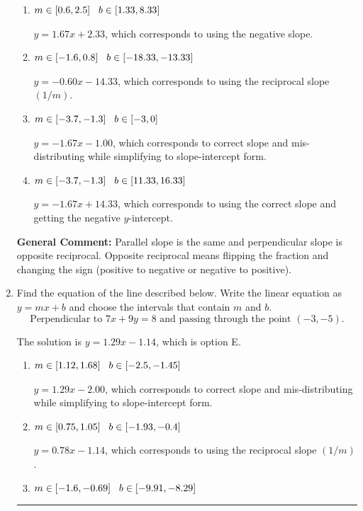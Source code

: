 \documentclass{extbook}[14pt]
\newcommand{\litem}[1]{\item #1

\rule{\textwidth}{0.4pt}}
\begin{document}
\begin{enumerate}
{\begin{enumerate}[label=\Alph*.]
* $y = -1.67x - 14.33$, which is the correct option.
\item \( m \in [0.6, 2.5] \hspace*{3mm} b \in [1.33, 8.33] \)

 $y = 1.67x + 2.33$, which corresponds to using the negative slope.
\item \( m \in [-1.6, 0.8] \hspace*{3mm} b \in [-18.33, -13.33] \)

 $y = -0.60x - 14.33$, which corresponds to using the reciprocal slope $(1/m)$.
\item \( m \in [-3.7, -1.3] \hspace*{3mm} b \in [-3, 0] \)

 $y = -1.67x - 1.00$, which corresponds to correct slope and mis-distributing while simplifying to slope-intercept form.
\item \( m \in [-3.7, -1.3] \hspace*{3mm} b \in [11.33, 16.33] \)

 $y = -1.67x + 14.33$, which corresponds to using the correct slope and getting the negative $y$-intercept.
\end{enumerate}

\textbf{General Comment:} Parallel slope is the same and perpendicular slope is opposite reciprocal. Opposite reciprocal means flipping the fraction and changing the sign (positive to negative or negative to positive).
}
\litem{
Find the equation of the line described below. Write the linear equation as $ y=mx+b $ and choose the intervals that contain $m$ and $b$.
\[ \text{Perpendicular to } 7 x + 9 y = 8 \text{ and passing through the point } (-3, -5). \]

The solution is \( y = 1.29x - 1.14 \), which is option E.\begin{enumerate}[label=\Alph*.]
\item \( m \in [1.12, 1.68] \hspace*{3mm} b \in [-2.5, -1.45] \)

 $y = 1.29x - 2.00$, which corresponds to correct slope and mis-distributing while simplifying to slope-intercept form.
\item \( m \in [0.75, 1.05] \hspace*{3mm} b \in [-1.93, -0.4] \)

 $y = 0.78x - 1.14$, which corresponds to using the reciprocal slope $(1/m)$.
\item \( m \in [-1.6, -0.69] \hspace*{3mm} b \in [-9.91, -8.29] \)


\end{enumerate}}
\end{enumerate}
\end{document}
